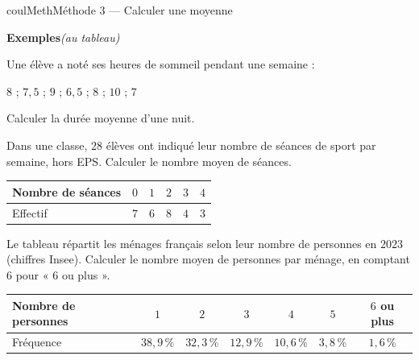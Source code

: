 \documentclass[11pt,a4paper]{article}
\makeatletter
\newcounter{lycee@signet}
\newcommand{\signet}[3][]{\stepcounter{lycee@signet}%
  \edef\lycee@dest{\if\relax\detokenize{#1}\relax
    signet.\arabic{lycee@signet}\else#1\fi}%
  \hypertarget{\lycee@dest}{}\bookmark[level=#2,dest=\lycee@dest]{#3}}
\newcounter{methode}
\newenvironment{methodebox}[1][Méthode]{\stepcounter{methode}%
  \begin{boitecours}[phantom={\signet[methode-\arabic{methode}]{2}{#1}}]{coulMeth}{#1}}%
  {\end{boitecours}}
\newcommand{\autableau}{\hfill{\footnotesize\itshape\color{black!45}(au tableau)}}
\newcommand{\etapeexemples}{%
    \par\smallskip\textbf{\color{coulMeth}Exemples}\autableau\par\nobreak\smallskip}
\makeatother
\begin{document}
\begin{methodebox}[Méthode 3 --- Calculer une moyenne]
\etapeexemples
\begin{questions}[label=\alph*)]
  \item Une élève a noté ses heures de sommeil pendant une semaine :
    \begin{center}
    $8$ ; $7{,}5$ ; $9$ ; $6{,}5$ ; $8$ ; $10$ ; $7$
    \end{center}
    Calculer la durée moyenne d'une nuit.
  \item Dans une classe, $28$ élèves ont indiqué leur nombre de séances de sport par
    semaine, hors EPS. Calculer le nombre moyen de séances.
    \begin{center}
    \renewcommand{\arraystretch}{1.5}
    \begin{tabular}{|l|*{5}{c|}}
    \hline
    Nombre de séances & $0$ & $1$ & $2$ & $3$ & $4$\\\hline
    Effectif & $7$ & $6$ & $8$ & $4$ & $3$\\\hline
    \end{tabular}
    \end{center}
  \item Le tableau répartit les ménages français selon leur nombre de personnes en
    $2023$ (chiffres Insee). Calculer le nombre moyen de personnes par ménage, en
    comptant $6$ pour « $6$ ou plus ».
    \begin{center}
    \renewcommand{\arraystretch}{1.5}
    \begin{tabular}{|l|*{6}{c|}}
    \hline
    Nombre de personnes & $1$ & $2$ & $3$ & $4$ & $5$ & $6$ ou plus\\\hline
    Fréquence & $38{,}9\,\%$ & $32{,}3\,\%$ & $12{,}9\,\%$ & $10{,}6\,\%$ & $3{,}8\,\%$
      & $1{,}6\,\%$\\\hline
    \end{tabular}
    \end{center}
\end{questions}


\end{methodebox}
\end{document}
